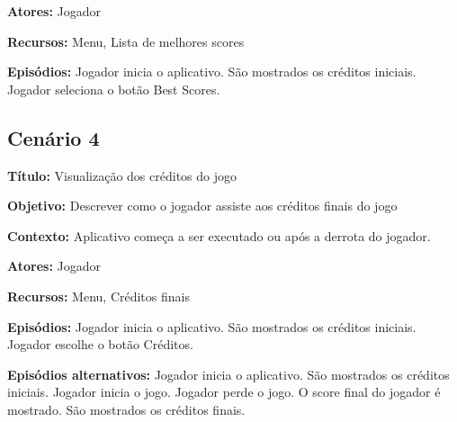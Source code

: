\textbf{Atores:} Jogador

\textbf{Recursos:} Menu, Lista de melhores scores

\textbf{Episódios:} Jogador inicia o aplicativo. São mostrados os créditos iniciais. Jogador seleciona o botão Best Scores. 

\subsection{Cenário 4}

\textbf{Título:} Visualização dos créditos do jogo

\textbf{Objetivo:} Descrever como o jogador assiste aos créditos finais do jogo

\textbf{Contexto:} Aplicativo começa a ser executado ou após a derrota do jogador.

\textbf{Atores:} Jogador

\textbf{Recursos:} Menu, Créditos finais

\textbf{Episódios:} Jogador inicia o aplicativo. São mostrados os créditos iniciais. Jogador escolhe o botão Créditos.

\textbf{Episódios alternativos:} Jogador inicia o aplicativo. São mostrados os créditos iniciais. Jogador inicia o jogo. Jogador perde o jogo. O score final do jogador é mostrado. São mostrados os créditos finais.

